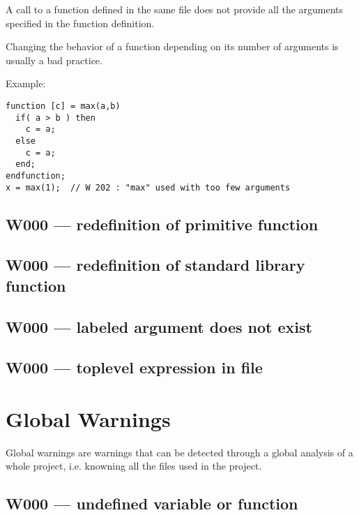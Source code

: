 A call to a function defined in the same file does not provide all the
arguments specified in the function definition.



Changing the behavior of a function depending on its number of
arguments is usually a bad practice.



Example:\begin{verbatim}
function [c] = max(a,b)
  if( a > b ) then
    c = a;
  else
    c = a;
  end;
endfunction;
x = max(1);  // W 202 : "max" used with too few arguments
\end{verbatim}




\subsection{W000 --- redefinition of primitive function}




\subsection{W000 --- redefinition of standard library function}




\subsection{W000 --- labeled argument does not exist}




\subsection{W000 --- toplevel expression in file}




\section{Global Warnings}

Global warnings are warnings that can be detected through a global
analysis of a whole project, i.e. knowning all the files used in the
project.

\subsection{W000 --- undefined variable or function}




